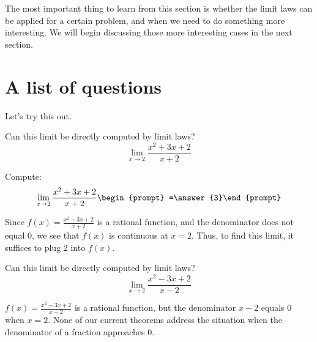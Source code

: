 \documentclass{ximera}
\begin{document}
The most important thing to learn from this section is whether the
limit laws can be applied for a certain problem, and when we need to
do something more interesting.  We will begin discussing those more
interesting cases in the next section.
\section{A list of questions}

Let's try this out.

\begin{question}
  Can this limit be directly computed by limit laws?
  \[
  \lim_{x\to 2}\frac{x^2+3x+2}{x+2}
  \]
  \begin{prompt}
  \begin{multipleChoice}
  \end{multipleChoice}
  \begin{question}
    Compute:
    \[
    \lim_{x\to 2}\frac{x^2+3x+2}{x+2}\begin{prompt} =\answer{3}\end{prompt}
    \]
    \begin{feedback}
      Since $f(x)=\frac{x^2+3x+2}{x+2}$ is a rational function, and
      the denominator does not equal $0$, we see that $f(x)$ is
      continuous at $x=2$.  Thus, to find this limit, it suffices to
      plug $2$ into $f(x)$.
    \end{feedback}
  \end{question}
  \end{prompt}
\end{question}


\begin{question}
  Can this limit be directly computed by limit laws?
  \[
  \lim_{x\to 2}\frac{x^2-3x+2}{x-2}
  \]
  \begin{prompt}
  \begin{multipleChoice}
  \end{multipleChoice}
  \begin{feedback}
    $f(x) = \frac{x^2-3x+2}{x-2}$ is a rational function, but the
    denominator $x-2$ equals $0$ when $x=2$. None of our current
    theorems address the situation when the denominator of a fraction
    approaches $0$.
  \end{feedback}
  \end{prompt}
\end{question}
\end{document}
